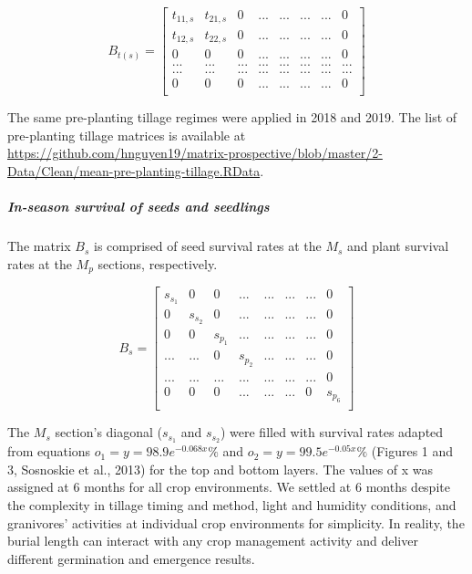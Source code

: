 \documentclass[
]{article}
\begin{document}
\[
B_{t(s)} = \left[\begin{array}
{rr|rrrrr} 
t_{11,s} & t_{21,s} & 0 & ... & ... & ... & ... & 0\\
t_{12,s} & t_{22,s} & 0 & ... & ... & ... & ... & 0\\
\hline    
0 & 0 & 0 & ... & ... & ... & ... &0\\
... & ... & ... & ... & ... & ... & ... & ...\\ 
... & ... & ... & ... & ... & ... & ... & ...\\ 
0 & 0 & 0 & ... & ... & ... & ... & 0\\
\end{array}\right]
\]

The same pre-planting tillage regimes were applied in 2018 and 2019. The list of pre-planting tillage matrices is available at \url{https://github.com/hnguyen19/matrix-prospective/blob/master/2-Data/Clean/mean-pre-planting-tillage.RData}.

\hypertarget{in-season-survival-of-seeds-and-seedlings}{%
\subparagraph*{In-season survival of seeds and seedlings}\label{in-season-survival-of-seeds-and-seedlings}}

The matrix \(B_s\) is comprised of seed survival rates at the \(M_s\) and plant survival rates at the \(M_p\) sections, respectively.

\[
B_s = \left[\begin{array}
{rr|rrrrr} 
s_{s_1}  & 0 & 0 & ... & ... & ... & ... & 0\\
0 & s_{s_2}  & 0 & ... & ... & ... & ... & 0\\
\hline             
0 & 0 & s_{p_1} & ... & ... & ...&...  & 0\\
... & ... & 0 & s_{p_2} & ... & ... & ... & 0\\ 
... & ... & ... & ... & ... & ... & ... & 0\\ 
0 & 0 & 0 & ... & ... & ...& 0 & s_{p_6}\\
\end{array}\right]
\]

The \(M_s\) section's diagonal (\(s_{s_1}\) and \(s_{s_2}\)) were filled with survival rates adapted from equations \(o_1 = y = 98.9 e^{-0.068x} \%\) and \(o_2 = y = 99.5 e^{-0.05x} \%\) (Figures 1 and 3, Sosnoskie et al., 2013) for the top and bottom layers. The values of x was assigned at 6 months for all crop environments. We settled at 6 months despite the complexity in tillage timing and method, light and humidity conditions, and granivores' activities at individual crop environments for simplicity. In reality, the burial length can interact with any crop management activity and deliver different germination and emergence results.
\end{document}
